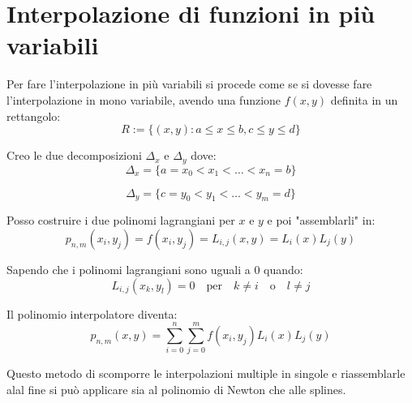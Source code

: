 \section{Interpolazione di funzioni in più variabili}

Per fare l'interpolazione in più variabili si procede come se si dovesse fare l'interpolazione
in mono variabile, avendo una funzione $f(x, y)$ definita in un rettangolo:
\begin{equation}
  R := \{(x, y): a\leq x \leq b, c \leq y \leq d\}
\end{equation}

Creo le due decomposizioni $\Delta_x$ e $\Delta_y$ dove:
\begin{equation*}
  \Delta_x = \{a = x_0 < x_1 < \dots < x_n = b\}
\end{equation*}

\begin{equation*}
  \Delta_y = \{c = y_0 < y_1 < \dots < y_m = d\}
\end{equation*}

Posso costruire i due polinomi lagrangiani per $x$ e $y$ e poi "assemblarli" in:
\begin{equation}
  p_{n,m}(x_i, y_j) = f(x_i, y_j) = L_{i,j}(x, y) = L_i(x)L_j(y)
\end{equation}

Sapendo che i polinomi lagrangiani sono uguali a 0 quando:
\begin{equation*}
  L_{i,j}(x_k, y_l) = 0 \quad \text{per} \quad k \neq i \quad \text{o} \quad l \neq j
\end{equation*}

Il polinomio interpolatore diventa:
\begin{equation}
  p_{n,m} (x, y) = \sum_{i=0}^n\sum_{j=0}^m f(x_i, y_j) L_i(x)L_j(y)
\end{equation}

Questo metodo di scomporre le interpolazioni multiple in singole e riassemblarle alal fine 
si può applicare sia al polinomio di Newton che alle splines.
